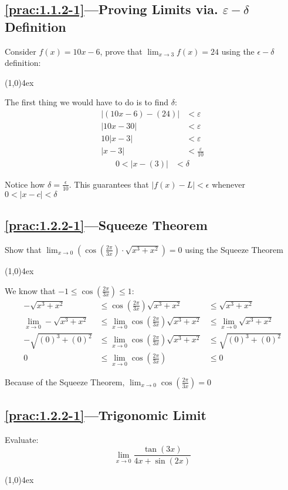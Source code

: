 \documentclass{MathNotes}
\newcommand{\br}{
	\begin{center}
		\line(1,0){4ex}
	\end{center}}
\begin{document}
\subsection*{\ref{prac:1.1.2-1}---Proving Limits via. $\varepsilon-\delta$ Definition}
\label{ans:1.1.2-1}
Consider $f(x)=10x-6$, prove that $\displaystyle\lim_{x\to 3}f(x)=24$ using the
$\epsilon-\delta$ definition:
\br
The first thing we would have to do is to find $\delta$:
\begin{align*}
	\lvert (10x-6)-(24) \rvert & <\varepsilon            \\
	\lvert 10x-30 \rvert       & <\varepsilon            \\
	10\lvert x-3 \rvert        & <\varepsilon            \\
	\lvert x-3 \rvert          & <\frac{\varepsilon}{10}
\end{align*}
\begin{align*}
	0 < \lvert x - (3)\rvert & < \delta
\end{align*}

Notice how $\delta=\frac{\epsilon}{10}$. This guarantees that
$\lvert f(x)-L \rvert < \epsilon$ whenever $0<\lvert x-c \rvert<\delta$

\subsection*{\ref{prac:1.2.2-1}---Squeeze Theorem}\label{ans:1.2.2-1}
Show that
$\displaystyle\lim_{x\to 0}(\cos(\frac{2\pi}{3x})\cdot\sqrt{x^3+x^2})=0$
using the Squeeze Theorem
\br
We know that $\displaystyle-1\leq\cos(\frac{2\pi}{3x})\leq 1$:
\begin{align*}
	-\sqrt{x^3+x^2}              & \leq\cos(\frac{2\pi}{3x})\sqrt{x^3+x^2} & \leq
	\sqrt{x^3+x^2}
	\\
	\lim_{x\to 0}-\sqrt{x^3+x^2} & \leq\lim_{x\to 0}\cos(\frac{2\pi}{3x})
	\sqrt{x^3+x^2}               & \leq\lim_{x\to 0}\sqrt{x^3+x^2}
	\\
	-\sqrt{(0)^3+(0)^2}          & \leq\lim_{x\to 0}\cos(\frac{2\pi}{3x})
	\sqrt{x^3+x^2}               & \leq\sqrt{(0)^3+(0)^2}
	\\
	0                            & \leq\lim_{x\to 0}\cos(\frac{2\pi}{3x})  & \leq0
\end{align*}

Because of the Squeeze Theorem, $\displaystyle\lim_{x\to 0}\cos(\frac{2\pi}{3x})=0$

\subsection*{\ref{prac:1.2.2-1}---Trigonomic Limit}\label{ans:1.2.2-2}
Evaluate:
$$\lim_{x\to 0}\frac{\tan(3x)}{4x+\sin(2x)}$$
\br
\end{document}

